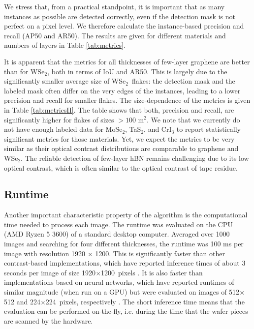 \documentclass[reprint, prl, superscriptaddress, floatfix]{revtex4-2}
\newcommand{\WSe}{WSe$_2$}
\begin{document}
We stress that, from a practical standpoint, it is important that as many instances as possible are detected correctly, even if the detection mask is not perfect on a pixel level. 
We therefore calculate the instance-based precision and recall (AP50 and AR50).
The results are given for different materials and numbers of layers in Table \ref{tab:metrics}.


It is apparent that the metrics for all thicknesses of few-layer graphene are better than for \WSe, both in terms of IoU and AR50.
This is largely due to the significantly smaller average size of \WSe\ flakes: the detection mask and the labeled mask often differ on the very edges of the instances, leading to a lower precision and recall for smaller flakes.  
The size-dependence of the metrics is given in Table \ref{tab:metricsII}. 
The table shows that both, precision and recall, are significantly higher for flakes of sizes $>100$ \textmu m$^2$.
We note that we currently do not have enough labeled data for MoSe$_2$, TaS$_2$, and CrI$_3$ to report statistically significant metrics for those materials.
Yet, we expect the metrics to be very similar as their optical contrast distributions are comparable to graphene and WSe$_2$.
The reliable detection of few-layer hBN remains challenging due to its low optical contrast, which is often similar to the optical contrast of tape residue.

\subsection{Runtime}
Another important characteristic property of the algorithm is the computational time needed to process each image. 
The runtime was evaluated on the CPU (AMD Ryzen 5 3600) of a standard desktop computer. 
Averaged over 1000 images and searching for four different thicknesses, the runtime was 100 ms per image with resolution 1920 $\times$ 1200. 
This is significantly faster than other contrast-based implementations, which have reported inference times of about 3 seconds per image of size 1920$\times$1200~pixels \cite{Yang2020Sep}.
It is also faster than implementations based on neural networks, which have reported runtimes of similar magnitude (when run on a GPU) but were evaluated on images of 512$\times$512 and 224$\times$224~pixels, respectively \cite{Yang2022Aug,Han2020Jul}.
The short inference time means that the evaluation can be performed on-the-fly, i.e. during the time that the wafer pieces are scanned by the hardware.
\end{document}
